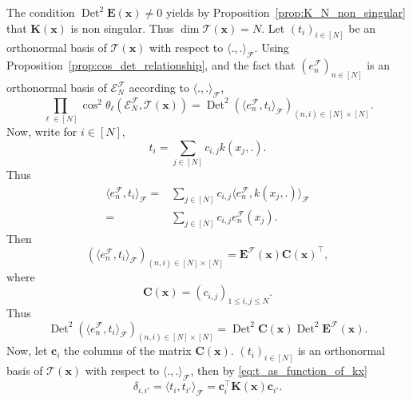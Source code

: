 \documentclass[twoside,11pt]{book}
\numberwithin{theorem}{chapter}
\numberwithin{definition}{chapter}
\numberwithin{proposition}{chapter}
\numberwithin{corollary}{chapter}
\numberwithin{example}{chapter}
\numberwithin{lemma}{chapter}
\numberwithin{assumption}{chapter}
\DeclareMathOperator{\Det}{Det}
\DeclareMathOperator{\Tran}{\intercal}
\begin{document}
The condition $\Det^{2} \bm{E}(\bm{x}) \neq 0$ yields by Proposition~\ref{prop:K_N_non_singular} that $\bm{K}(\bm{x})$ is non singular. Thus $\dim \mathcal{T}(\bm{x}) = N$. Let $(t_{i})_{i \in [N]}$ be an orthonormal basis of $\mathcal{T}(\bm{x})$ with respect to $\langle ., . \rangle_{\mathcal{F}}$.
%
Using Proposition~\ref{prop:cos_det_relationship}, and the fact that $(e_{n}^{\mathcal{F}})_{n \in [N]}$ is an orthonormal basis of $\mathcal{E}^{\mathcal{F}}_{N}$ according to $\langle ., . \rangle_{\mathcal{F}}$,
\begin{equation}\label{eq:prod_cos_det_E}
\prod\limits_{\ell \in [N]} \cos^{2} \theta_{\ell} \left(\mathcal{E}^{\mathcal{F}}_{N}, \mathcal{T}(\bm{x}) \right) = \Det^{2} (\langle e_{n}^{\mathcal{F}}, t_{i} \rangle_{\mathcal{F}})_{(n,i) \in [N]\times[N]}.
\end{equation}
Now, write for $i \in [N]$,
\begin{equation}\label{eq:t_as_function_of_kx}
t_{i} = \sum\limits_{j \in [N]} c_{i,j} k(x_{j},.).
\end{equation}
%
Thus
\begin{align}
\langle e_{n}^{\mathcal{F}}, t_{i} \rangle_{\mathcal{F}} = & \sum\limits_{j \in [N]} c_{i,j} \langle e_{n}^{\mathcal{F}}, k(x_{j},.) \rangle_{\mathcal{F}} \\
= &\sum\limits_{j \in [N]} c_{i,j}  e_{n}^{\mathcal{F}}(x_{j}).
\end{align}
%
Then
\begin{equation}
(\langle e_{n}^{\mathcal{F}}, t_{i} \rangle_{\mathcal{F}})_{(n,i) \in [N]\times[N]} = \bm{E}^{\mathcal{F}}(\bm{x}) \bm{C}(\bm{x})^{\Tran} ,
\end{equation}
where
\begin{equation}
\bm{C}(\bm{x}) = (c_{i,j})_{1 \leq i,j \leq N}.
\end{equation}
%
Thus
\begin{equation}\label{eq:AN_times_EN}
\Det^{2} (\langle e_{n}^{\mathcal{F}}, t_{i} \rangle_{\mathcal{F}})_{(n,i) \in [N]\times[N]} = \Det^{2} \bm{C}(\bm{x}) \Det^{2} \bm{E}^{\mathcal{F}}(\bm{x}).
\end{equation}
Now, let $\bm{c}_{i}$ the columns of the matrix $\bm{C}(\bm{x})$. $(t_{i})_{i \in [N]}$ is an orthonormal basis of $\mathcal{T}(\bm{x})$ with respect to $\langle .,. \rangle_{\mathcal{F}}$, then by \eqref{eq:t_as_function_of_kx}
\begin{equation}
  \delta_{i,i'} = \langle t_{i}, t_{i'} \rangle_{\mathcal{F}} = \bm{c}_{i}^{\Tran} \bm{K}(\bm{x}) \bm{c}_{i'}  .
\end{equation}
\end{document}
